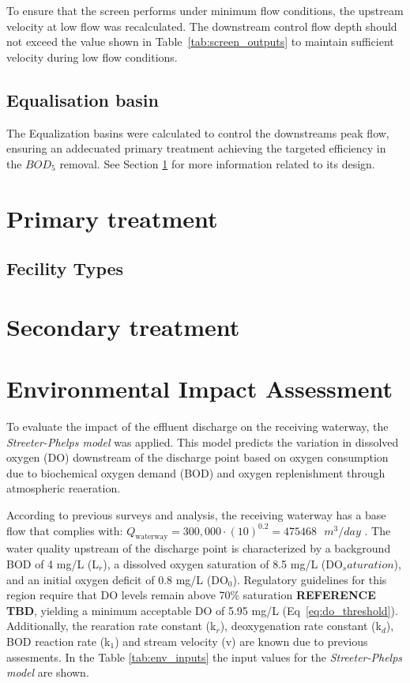 \documentclass[12pt]{article}
\begin{document}
To ensure that the screen performs under minimum flow conditions, 
the upstream velocity at low flow was recalculated. The downstream control 
flow depth should not exceed the value shown in Table~\ref{tab:screen_outputs} to 
maintain sufficient velocity during low flow conditions.

\subsection{Equalisation basin}
\label{sec:equalization_basin}

The Equalization basins were calculated to control the downstreams peak flow, ensuring 
an addecuated primary treatment achieving the targeted efficiency in the $BOD_5$ 
removal. See Section \ref{sec:primary_treat} for more information related to its design.

\section{Primary treatment}
\label{sec:primary_treat}

\subsection{Fecility Types}
\label{sec:primary_facility_types}


\newpage

\section{Secondary treatment}
\label{sec:secondary_trat}
\newpage


\section{Environmental Impact Assessment}
\label{sec:env_impact}

To evaluate the impact of the effluent discharge on the receiving waterway, 
the \textit{Streeter-Phelps model} was applied. This model predicts the variation in dissolved 
oxygen (DO) downstream of the discharge point based on oxygen consumption due to biochemical 
oxygen demand (BOD) and oxygen replenishment through atmospheric reaeration.

According to previous surveys and analysis, the receiving waterway has a base flow that complies
with: 
\(Q_{\text{waterway}} = 300{,}000 \cdot \left(\text{10}\right)^{0.2} = 475468 \text{ } m^3/day\)
. The water quality upstream 
of the discharge point is characterized by a background BOD of 4 mg/L (L$_r$), a dissolved oxygen saturation 
of 8.5 mg/L (DO$_saturation$), and an initial oxygen deficit of 0.8 mg/L (DO$_0$). Regulatory guidelines for this region require 
that DO levels remain above 70\% saturation \textbf{REFERENCE TBD}, yielding a minimum acceptable DO of 5.95 mg/L (Eq~\eqref{eq:do_threshold}).
Additionally, the rearation rate constant (k$_r$), deoxygenation rate constant (k$_d$), BOD reaction rate
(k$_1$) and stream velocity (v) are known due to previous assesments. In the Table \ref{tab:env_inputs} the
input values for the \textit{Streeter-Phelps model} are shown.\\
\end{document}
